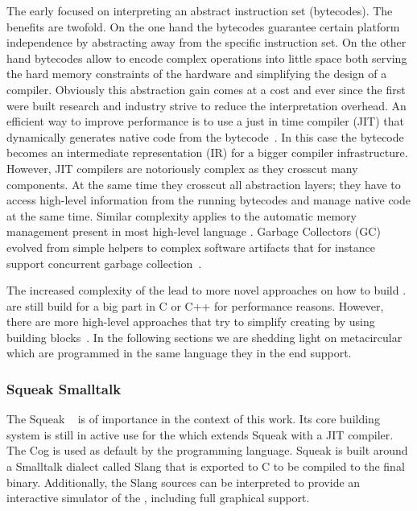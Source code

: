 The early \VMs focused on interpreting an abstract instruction set (bytecodes).
The benefits are twofold.
On the one hand the bytecodes guarantee certain platform independence by abstracting away from the \CPU specific instruction set.
On the other hand bytecodes allow to encode complex operations into little space both serving the hard memory constraints of the hardware and simplifying the design of a compiler.
Obviously this abstraction gain comes at a cost and ever since the first \VMs were built research and industry strive to reduce the interpretation overhead.
An efficient way to improve performance is to use a just in time compiler (JIT) that dynamically generates native code from the bytecode~\cite{Deut84a}.
In this case the bytecode becomes an intermediate representation (IR) for a bigger compiler infrastructure.
However, JIT compilers are notoriously complex as they crosscut many \VM components.
At the same time they crosscut all abstraction layers; they have to access high-level information from the running bytecodes and manage native code at the same time.
Similar complexity applies to the automatic memory management present in most high-level language \VMs.
Garbage Collectors (GC) evolved from simple helpers to complex software artifacts that for instance support concurrent garbage collection~\cite{Clic05a}.

The increased complexity of the \VMs lead to more novel approaches on how to build \VMs.
\VMs are still build for a big part in C or C++ for performance reasons.
However, there are more high-level approaches that try to simplify creating \VMs by using building blocks~\cite{Geof10a}.
In the following sections we are shedding light on metacircular \VMs which are programmed in the same language they in the end support.


\subsubsection*{Squeak Smalltalk \VM}
The Squeak \VM~\cite{Inga97a} is of importance in the context of this work.
Its core building system is still in active use for the  which extends Squeak with a JIT compiler.
The Cog \VM is used as default by the  programming language.
Squeak is built around a Smalltalk dialect called Slang that is exported to C to be compiled to the final \VM binary.
Additionally, the Slang sources can be interpreted to provide an interactive simulator of the \VM, including full graphical support.

